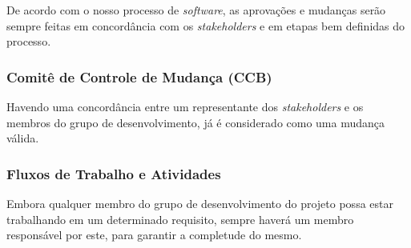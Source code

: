 De acordo com o nosso processo de \textit{software}, as aprovações e mudanças serão sempre feitas em concordância com os \textit{stakeholders} e em etapas bem definidas do processo.

\subsubsection{Comitê de Controle de Mudança (CCB)}

Havendo uma concordância entre um representante dos \textit{stakeholders} e os membros do grupo de desenvolvimento, já é considerado como uma mudança válida.

\subsubsection{Fluxos de Trabalho e Atividades}

Embora qualquer membro do grupo de desenvolvimento do projeto possa estar trabalhando em um determinado requisito, sempre haverá um membro responsável por este, para garantir a completude do mesmo.
